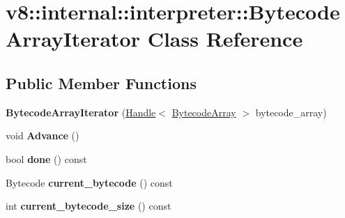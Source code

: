 \hypertarget{classv8_1_1internal_1_1interpreter_1_1_bytecode_array_iterator}{}\section{v8\+:\+:internal\+:\+:interpreter\+:\+:Bytecode\+Array\+Iterator Class Reference}
\label{classv8_1_1internal_1_1interpreter_1_1_bytecode_array_iterator}
\subsection*{Public Member Functions}
\begin{DoxyCompactItemize}
\item 
{\bfseries Bytecode\+Array\+Iterator} (\hyperlink{classv8_1_1internal_1_1_handle}{Handle}$<$ \hyperlink{classv8_1_1internal_1_1_bytecode_array}{Bytecode\+Array} $>$ bytecode\+\_\+array)\hypertarget{classv8_1_1internal_1_1interpreter_1_1_bytecode_array_iterator_a204aeb610f10582f2a80f87ec8a0ddbd}{}\label{classv8_1_1internal_1_1interpreter_1_1_bytecode_array_iterator_a204aeb610f10582f2a80f87ec8a0ddbd}

\item 
void {\bfseries Advance} ()\hypertarget{classv8_1_1internal_1_1interpreter_1_1_bytecode_array_iterator_a5ad6a109b5185076627b9cf3f0e3dd3b}{}\label{classv8_1_1internal_1_1interpreter_1_1_bytecode_array_iterator_a5ad6a109b5185076627b9cf3f0e3dd3b}

\item 
bool {\bfseries done} () const \hypertarget{classv8_1_1internal_1_1interpreter_1_1_bytecode_array_iterator_af62109819ab1345bb4c026bddc083541}{}\label{classv8_1_1internal_1_1interpreter_1_1_bytecode_array_iterator_af62109819ab1345bb4c026bddc083541}

\item 
Bytecode {\bfseries current\+\_\+bytecode} () const \hypertarget{classv8_1_1internal_1_1interpreter_1_1_bytecode_array_iterator_a6d61a70bb740fb268887dfab0e94bf5a}{}\label{classv8_1_1internal_1_1interpreter_1_1_bytecode_array_iterator_a6d61a70bb740fb268887dfab0e94bf5a}

\item 
int {\bfseries current\+\_\+bytecode\+\_\+size} () const \hypertarget{classv8_1_1internal_1_1interpreter_1_1_bytecode_array_iterator_a87556209d811c9dce70bc01190b66e9f}{}\label{classv8_1_1internal_1_1interpreter_1_1_bytecode_array_iterator_a87556209d811c9dce70bc01190b66e9f}


\end{DoxyCompactItemize}

